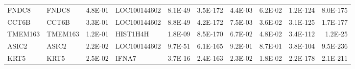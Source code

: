 \begin{table}[p]
{\begin{minipage}{.94\textheight}
\begin{adjustbox}{max width=\linewidth}
\begin{tabular}{llrlrrrrrr}
FNDC8&FNDC8&4.8E-01&LOC100144602&8.1E-49&3.5E-172&4.4E-03&6.2E-02&1.2E-124&8.0E-175\\
CCT6B&CCT6B&3.3E-01&LOC100144602&8.8E-49&4.2E-172&7.5E-03&3.6E-02&3.1E-125&1.7E-177\\
TMEM163&TMEM163&1.2E-01&HIST1H4H&1.8E-09&8.5E-170&6.7E-02&4.8E-02&3.4E-112&1.2E-25\\
ASIC2&ASIC2&2.2E-02&LOC100144602&9.7E-51&6.1E-165&9.2E-01&8.7E-01&3.8E-104&9.5E-236\\
KRT5&KRT5&2.5E-02&IFNA7&3.7E-16&2.4E-163&2.3E-02&1.8E-02&2.2E-178&2.1E-211\\
\bottomrule
\end{tabular}
\end{adjustbox}
\end{minipage}}
\end{table}
